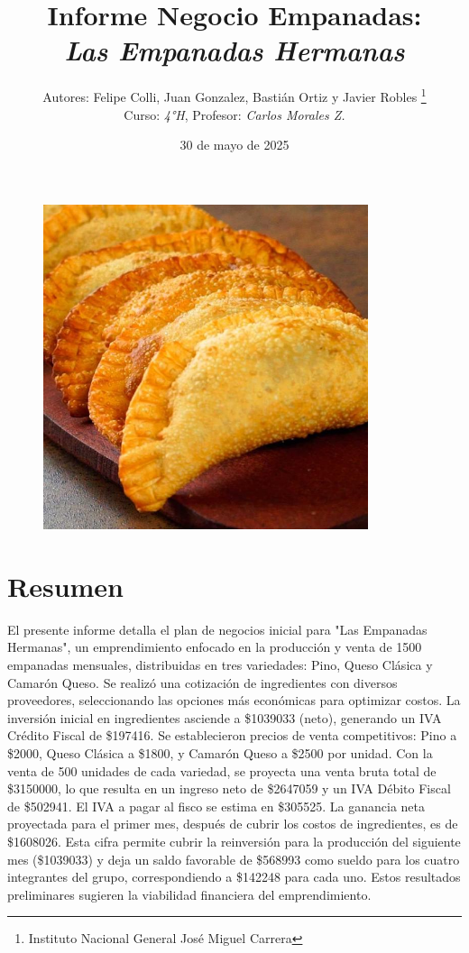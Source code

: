 \documentclass[12pt]{article}
\title{Informe Negocio Empanadas: \\
\textit{Las Empanadas Hermanas}} %
\author{Autores: Felipe Colli, Juan Gonzalez, Bastián Ortiz y Javier Robles \thanks{Instituto Nacional General José Miguel Carrera} \\
  Curso: \textit{4°H}, Profesor: \textit{Carlos Morales Z.}} %
\date{30 de mayo de 2025} %
\begin{document}
\maketitle
\begin{figure}[H]
    \centering
    \includegraphics[width=0.85\textwidth]{empanadas} %
\end{figure}
\newpage

\tableofcontents
\newpage

\section{Resumen} %
El presente informe detalla el plan de negocios inicial para "Las Empanadas Hermanas", un emprendimiento enfocado en la producción y venta de 1500 empanadas mensuales, distribuidas en tres variedades: Pino, Queso Clásica y Camarón Queso. Se realizó una cotización de ingredientes con diversos proveedores, seleccionando las opciones más económicas para optimizar costos.
La inversión inicial en ingredientes asciende a \$\num{1039033} (neto), generando un IVA Crédito Fiscal de \$\num{197416}.
Se establecieron precios de venta competitivos: Pino a \$\num{2000}, Queso Clásica a \$\num{1800}, y Camarón Queso a \$\num{2500} por unidad. Con la venta de 500 unidades de cada variedad, se proyecta una venta bruta total de \$\num{3150000}, lo que resulta en un ingreso neto de \$\num{2647059} y un IVA Débito Fiscal de \$\num{502941}.
El IVA a pagar al fisco se estima en \$\num{305525}.
La ganancia neta proyectada para el primer mes, después de cubrir los costos de ingredientes, es de \$\num{1608026}. Esta cifra permite cubrir la reinversión para la producción del siguiente mes (\$\num{1039033}) y deja un saldo favorable de \$\num{568993} como sueldo para los cuatro integrantes del grupo, correspondiendo a \$\num{142248} para cada uno. Estos resultados preliminares sugieren la viabilidad financiera del emprendimiento.
\end{document}
